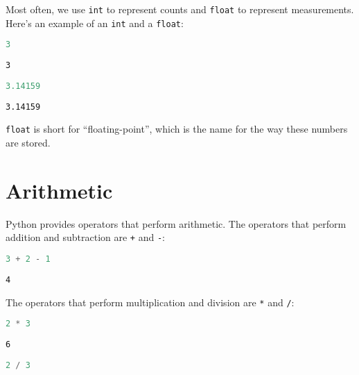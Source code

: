 Most often, we use \passthrough{\lstinline!int!} to represent counts and
\passthrough{\lstinline!float!} to represent measurements. Here's an
example of an \passthrough{\lstinline!int!} and a
\passthrough{\lstinline!float!}:

\begin{lstlisting}[language=Python]
3
\end{lstlisting}

\begin{lstlisting}[]
3
\end{lstlisting}

\begin{lstlisting}[language=Python]
3.14159
\end{lstlisting}

\begin{lstlisting}[]
3.14159
\end{lstlisting}

\passthrough{\lstinline!float!} is short for ``floating-point'', which
is the name for the way these numbers are stored.

\hypertarget{arithmetic}{%
\section{Arithmetic}\label{arithmetic}}

Python provides operators that perform arithmetic. The operators that
perform addition and subtraction are \passthrough{\lstinline!+!} and
\passthrough{\lstinline!-!}:

\begin{lstlisting}[language=Python]
3 + 2 - 1
\end{lstlisting}

\begin{lstlisting}[]
4
\end{lstlisting}

The operators that perform multiplication and division are
\passthrough{\lstinline!*!} and \passthrough{\lstinline!/!}:

\begin{lstlisting}[language=Python]
2 * 3
\end{lstlisting}

\begin{lstlisting}[]
6
\end{lstlisting}

\begin{lstlisting}[language=Python]
2 / 3
\end{lstlisting}

